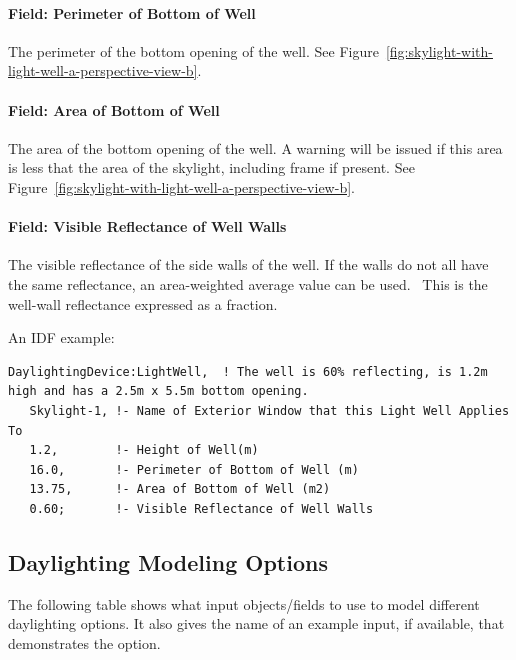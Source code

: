 \paragraph{Field: Perimeter of Bottom of Well}\label{field-perimeter-of-bottom-of-well}

The perimeter of the bottom opening of the well. See Figure~\ref{fig:skylight-with-light-well-a-perspective-view-b}.

\paragraph{Field: Area of Bottom of Well}\label{field-area-of-bottom-of-well}

The area of the bottom opening of the well. A warning will be issued if this area is less that the area of the skylight, including frame if present. See Figure~\ref{fig:skylight-with-light-well-a-perspective-view-b}.

\paragraph{Field: Visible Reflectance of Well Walls}\label{field-visible-reflectance-of-well-walls}

The visible reflectance of the side walls of the well. If the walls do not all have the same reflectance, an area-weighted average value can be used.~ This is the well-wall reflectance expressed as a fraction.

An IDF example:

\begin{lstlisting}
DaylightingDevice:LightWell,  ! The well is 60% reflecting, is 1.2m high and has a 2.5m x 5.5m bottom opening.
   Skylight-1, !- Name of Exterior Window that this Light Well Applies To
   1.2,        !- Height of Well(m)
   16.0,       !- Perimeter of Bottom of Well (m)
   13.75,      !- Area of Bottom of Well (m2)
   0.60;       !- Visible Reflectance of Well Walls
\end{lstlisting}

\subsection{Daylighting Modeling Options}\label{daylighting-modeling-options}

The following table shows what input objects/fields to use to model different daylighting options. It also gives the name of an example input, if available, that demonstrates the option.

